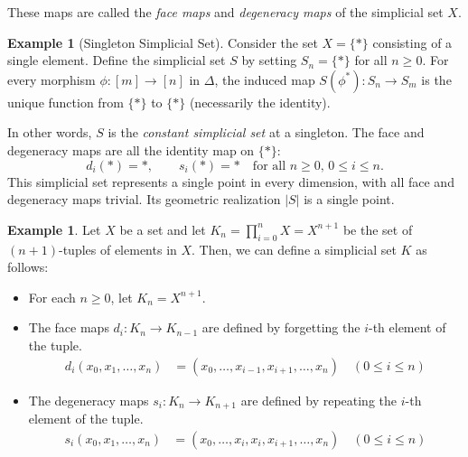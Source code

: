 \documentclass[11pt]{article}
\theoremstyle{definition}
\newtheorem{example}[definition]{Example}
\theoremstyle{plain}
\begin{document}
These maps are called the \emph{face maps} and \emph{degeneracy maps} of the simplicial set $X$.
\begin{example}[Singleton Simplicial Set]
    Consider the set $X = \{\ast\}$ consisting of a single element. Define the simplicial set $S$ by setting $S_n = \{\ast\}$ for all $n \geq 0$. For every morphism $\phi : [m] \to [n]$ in $\Delta$, the induced map $S(\phi^*) : S_n \to S_m$ is the unique function from $\{\ast\}$ to $\{\ast\}$ (necessarily the identity).

    In other words, $S$ is the \emph{constant simplicial set} at a singleton. The face and degeneracy maps are all the identity map on $\{\ast\}$:
    \[
        d_i(\ast) = \ast, \qquad s_i(\ast) = \ast \quad \text{for all } n \geq 0,\, 0 \leq i \leq n.
    \]
    This simplicial set represents a single point in every dimension, with all face and degeneracy maps trivial. Its geometric realization $|S|$ is a single point.
\end{example}


\begin{example}
    Let $X$ be a set and let $K_n =\prod_{i=0}^n X=X^{n+1}$ be the set of $(n+1)$-tuples of elements in $X$. Then, we can define a simplicial set $K$ as follows:
    \begin{itemize}
        \item For each $n \geq 0$, let $K_n = X^{n+1}$.
        \item The face maps $d_i : K_n \to K_{n-1}$ are defined by forgetting the $i$-th element of the tuple.
              \begin{align*}
                  d_i(x_0, x_1, \ldots, x_n) & = (x_0, \ldots, x_{i-1}, x_{i+1}, \ldots, x_n) \quad (0 \leq i \leq n)
              \end{align*}
        \item The degeneracy maps $s_i : K_n \to K_{n+1}$ are defined by repeating the $i$-th element of the tuple.
              \begin{align*}
                  s_i(x_0, x_1, \ldots, x_n) & = (x_0, \ldots, x_i, x_i, x_{i+1}, \ldots, x_n) \quad (0 \leq i \leq n)
              \end{align*}
    \end{itemize}

\end{example}
\end{document}
